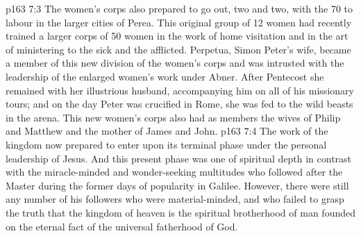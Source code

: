 \vs p163 7:3 The women’s corps also prepared to go out, two and two, with the 70 to labour in the larger cities of Perea. This original group of 12 women had recently trained a larger corps of 50 women in the work of home visitation and in the art of ministering to the sick and the afflicted. Perpetua, Simon Peter’s wife, became a member of this new division of the women’s corps and was intrusted with the leadership of the enlarged women’s work under Abner. After Pentecost she remained with her illustrious husband, accompanying him on all of his missionary tours; and on the day Peter was crucified in Rome, she was fed to the wild beasts in the arena. This new women’s corps also had as members the wives of Philip and Matthew and the mother of James and John.
\vs p163 7:4 The work of the kingdom now prepared to enter upon its terminal phase under the personal leadership of Jesus. And this present phase was one of spiritual depth in contrast with the miracle\hyp{}minded and wonder\hyp{}seeking multitudes who followed after the Master during the former days of popularity in Galilee. However, there were still any number of his followers who were material\hyp{}minded, and who failed to grasp the truth that the kingdom of heaven is the spiritual brotherhood of man founded on the eternal fact of the universal fatherhood of God.
\quizlink
